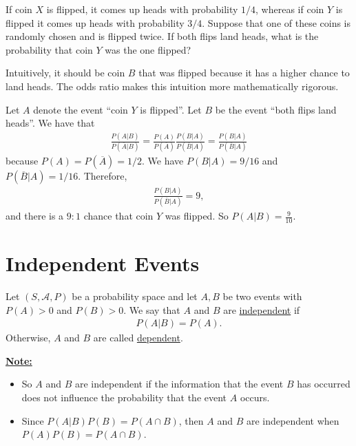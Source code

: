 \begin{example}
If coin $X$ is flipped, it comes up heads with probability $1/4$, whereas if coin $Y$ is flipped it comes up heads with probability $3/4$. Suppose that one of these coins is randomly chosen and is flipped twice. If both flips land heads, what is the probability that coin $Y$ was the one flipped?
\end{example}

\begin{sol}
Intuitively, it should be coin $B$ that was flipped because it has a higher chance to land heads. The odds ratio makes this intuition more mathematically rigorous.

Let $A$ denote the event ``coin $Y$ is flipped''. Let $B$ be the event ``both flips land heads''. We have that
	\begin{align*}
	\frac{P (A|B)}{P (\overline{A} | B)} = \frac{P (A)}{P (\overline{A})} \frac{P (B|A)}{P (\overline{B} | A )} = \frac{P (B|A)}{P (\overline{B} | A )}
	\end{align*}
because $P (A) = P (\overline{A}) = 1/2$. We have $P (B|A) = 9/16$ and $P (\overline{B} |A) = 1/16$. Therefore,
	\begin{align*}
	 \frac{P (B|A)}{P (\overline{B} | A )} = 9 ,
	\end{align*}
and there is a $9:1$ chance that coin $Y$ was flipped. So $P (A|B) = \frac{9}{10}$.
\end{sol}

\section{Independent Events}

\begin{definition}
Let $(S , \mathcal{A} , P )$ be a probability space and let $A, B$ be two events with $P (A) > 0$ and $P (B) > 0$. We say that $A$ and $B$ are \underline{independent} if
	\begin{align*}
	P (A | B ) = P (A) .
	\end{align*}
Otherwise, $A$ and $B$ are called \underline{dependent}.
\end{definition}

\underline{\textbf{Note:}} 
	\begin{itemize}
	\item So $A$ and $B$ are independent if the information that the event $B$ has occurred does not influence the probability that the event $A$ occurs. 
	\item Since $P (A | B) P (B) = P (A \cap B)$, then $A$ and $B$ are independent when $P (A) P (B) = P (A \cap B)$.
	\end{itemize}

